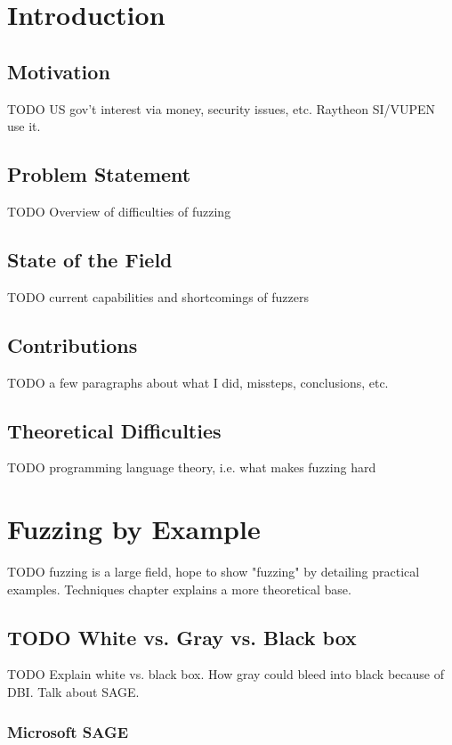\documentclass[11pt,expanded,copyright]{fsuthesis}
\begin{document}
\chapter{Introduction}

\section{Motivation}
TODO US gov't interest via money, security issues, etc.
Raytheon SI/VUPEN use it.

\section{Problem Statement}

TODO Overview of difficulties of fuzzing

\section{State of the Field}

TODO current capabilities and shortcomings of fuzzers

\section{Contributions}

TODO a few paragraphs about what I did, missteps, conclusions, etc.

\section{Theoretical Difficulties}
TODO programming language theory, i.e. what makes fuzzing hard


\chapter{Fuzzing by Example}

TODO fuzzing is a large field, hope to show "fuzzing" by detailing practical examples. Techniques chapter explains a more theoretical base.

\section{TODO White vs. Gray vs. Black box}

TODO Explain white vs. black box. How gray could bleed into black because of DBI. Talk about SAGE.

\subsection{Microsoft SAGE}
\end{document}
